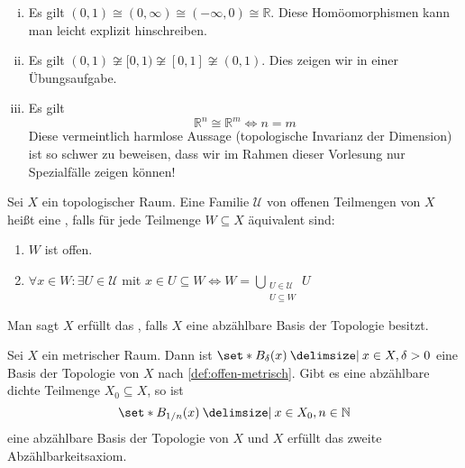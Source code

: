 \begin{beispiel}[{name=[Homöomorphismen]}]
	\begin{enumerate}[(i)]
		\item Es gilt $(0,1) \cong (0,\infty) \cong (-\infty,0) \cong \mathbb{R}$. 
		Diese Homöomorphismen kann man leicht explizit hinschreiben.
		\item Es gilt $(0,1)\not\cong [0,1) \not\cong [0,1] \not\cong (0,1)$. 
		Dies zeigen wir in einer Übungsaufgabe.
		\item Es gilt
		\[
			\mathbb{R}^n \cong \mathbb{R}^m \iff n=m
		\]
		Diese vermeintlich harmlose Aussage (topologische Invarianz der Dimension) ist so schwer zu beweisen, dass wir im Rahmen dieser Vorlesung nur Spezialfälle zeigen können!
	\end{enumerate}
\end{beispiel}

\begin{definition}[{name=[Basis einer Topologie]}]
	Sei $X$ ein topologischer Raum. 
	Eine Familie $\mathcal{U}$ von offenen Teilmengen von $X$ heißt eine , falls für jede Teilmenge $W \subseteq X$
	äquivalent sind:
	\begin{enumerate}[(1)]
		\item $W$ ist offen.
		\item $\forall x \in W  : \exists U \in \mathcal{U}$ mit $x \in U \subseteq  W \iff W = \bigcup_{\substack{U \in \mathcal{U} \\ U \subseteq W}} U$ 
	\end{enumerate}
	Man sagt $X$ erfüllt das , falls $X$ eine abzählbare Basis der Topologie besitzt.
\end{definition}

\begin{beispiel}[{name=[Basis der Topologie eines metrischen Raumes]}]
	Sei $X$ ein metrischer Raum. 
	Dann ist $\set*{B_\delta (x) \given x \in X, \delta > 0}$ eine Basis der Topologie von $X$ nach \cref{def:offen-metrisch}. 
	Gibt es eine abzählbare dichte Teilmenge $X_0\subseteq X$, so ist 
	\[
		\set*{B_{1/n}(x) \given x \in X_0, n \in \mathbb{N}}
	\]
	eine abzählbare Basis der Topologie von $X$ und $X$ erfüllt das zweite Abzählbarkeitsaxiom.
\end{beispiel}

